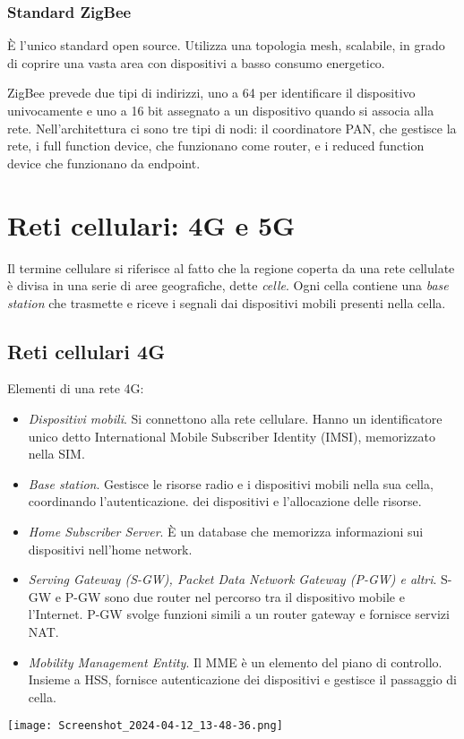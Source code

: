 \documentclass[11pt]{book}
\begin{document}
\subsubsection{Standard ZigBee}
È l'unico standard open source. Utilizza una topologia mesh, scalabile, in grado di coprire una vasta area con dispositivi 
a basso consumo energetico.

ZigBee prevede due tipi di indirizzi, uno a 64 per identificare il dispositivo univocamente e uno a 16 bit assegnato 
a un dispositivo quando si associa alla rete. Nell'architettura ci sono tre tipi di nodi: il coordinatore PAN, che gestisce 
la rete, i full function device, che funzionano come router, e i reduced function device che funzionano da endpoint.
\section{Reti cellulari: 4G e 5G}
Il termine cellulare si riferisce al fatto che la regione coperta da una rete cellulate è divisa in una serie di aree 
geografiche, dette \textit{celle}. Ogni cella contiene una \textit{base station} che trasmette e riceve i segnali dai 
dispositivi mobili presenti nella cella.
\subsection{Reti cellulari 4G}
Elementi di una rete 4G:
\begin{itemize}
    \item \textit{Dispositivi mobili}. Si connettono alla rete cellulare. Hanno un identificatore unico detto International 
    Mobile Subscriber Identity (IMSI), memorizzato nella SIM. 
    \item \textit{Base station}. Gestisce le risorse radio e i dispositivi mobili nella sua cella, coordinando l'autenticazione.
    dei dispositivi e l'allocazione delle risorse.
    \item \textit{Home Subscriber Server}. È un database che memorizza informazioni sui dispositivi nell'home network.
    \item \textit{Serving Gateway (S-GW), Packet Data Network Gateway (P-GW) e altri}. S-GW e P-GW sono due router nel 
    percorso tra il dispositivo mobile e l'Internet. P-GW svolge funzioni simili a un router gateway e fornisce servizi 
    NAT.
    \item \textit{Mobility Management Entity}. Il MME è un elemento del piano di controllo. Insieme a HSS, fornisce autenticazione 
    dei dispositivi e gestisce il passaggio di cella.
\end{itemize}
\texttt{[image: Screenshot\_2024-04-12\_13-48-36.png]}
\end{document}
